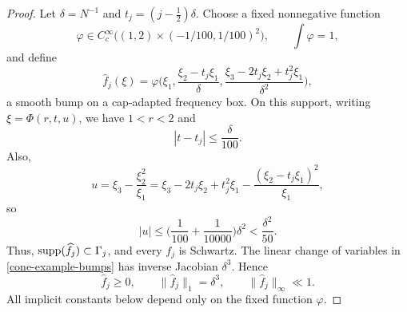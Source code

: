 \documentclass{amsart}
\numberwithin{equation}{section}
\newcommand{\wh}{\widehat}
\newcommand{\supp}{{\rm supp}}
\begin{document}
\begin{proof}
Let $\delta=N^{-1}$ and $t_j=(j-\frac12)\delta$.
Choose a fixed nonnegative function
\[
    \varphi\in C_c^\infty\big((1,2)\times(-1/100,1/100)^2\big),
    \qquad \int\varphi=1,
\]
and define
\begin{equation}
\label{cone-example-bumps}
    \wh f_j(\xi)=
    \varphi\Big(
        \xi_1,\frac{\xi_2-t_j\xi_1}{\delta},
        \frac{\xi_3-2t_j\xi_2+t_j^2\xi_1}{\delta^2}
    \Big),
\end{equation}
a smooth bump on a cap-adapted frequency box.
On this support, writing $\xi=\Phi(r,t,u)$, we have $1<r<2$ and
\[
    |t-t_j|\leq\frac{\delta}{100}.
\]
Also,
\[
    u=\xi_3-\frac{\xi_2^2}{\xi_1}
    =\xi_3-2t_j\xi_2+t_j^2\xi_1
    -\frac{(\xi_2-t_j\xi_1)^2}{\xi_1},
\]
so
\begin{equation}
\nonumber
    |u|
    \leq\Big(\frac1{100}+\frac1{10000}\Big)\delta^2
    <\frac{\delta^2}{50}.
\end{equation}
Thus, $\supp(\wh f_j)\subset\Gamma_j$, and every $f_j$ is Schwartz.
The linear change of variables in \eqref{cone-example-bumps} has
inverse Jacobian $\delta^3$. Hence
\begin{equation}
\label{cone-example-mass}
    \wh f_j\geq0,\qquad
    \|\wh f_j\|_1=\delta^3,\qquad
    \|\wh f_j\|_\infty\ll1.
\end{equation}
All implicit constants below depend only on the fixed function
$\varphi$.

\medskip


\end{proof}
\end{document}

